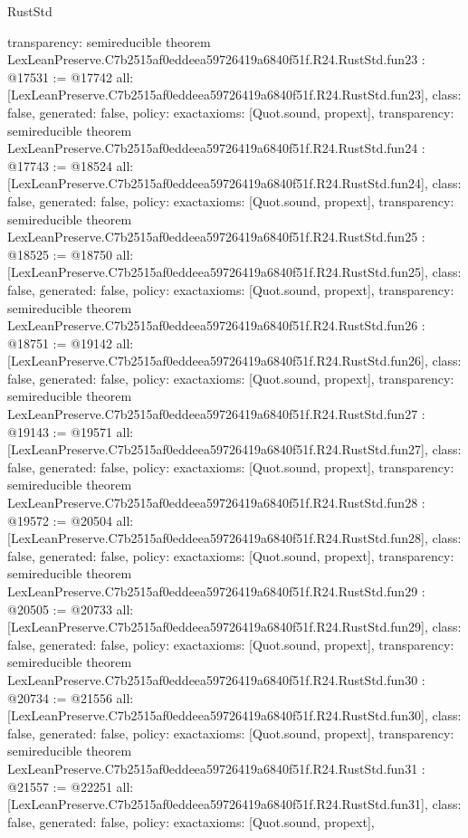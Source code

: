 \begin{lexlean}{RustStd}
\begin{coremodule}
{  transparency: semireducible
}
theorem LexLeanPreserve.C7b2515af0eddeea59726419a6840f51f.R24.RustStd.fun23 : @17531 := @17742 {
  all: [LexLeanPreserve.C7b2515af0eddeea59726419a6840f51f.R24.RustStd.fun23],
  class: false,
  generated: false,
  policy: exact{axioms: [Quot.sound, propext]},
  transparency: semireducible
}
theorem LexLeanPreserve.C7b2515af0eddeea59726419a6840f51f.R24.RustStd.fun24 : @17743 := @18524 {
  all: [LexLeanPreserve.C7b2515af0eddeea59726419a6840f51f.R24.RustStd.fun24],
  class: false,
  generated: false,
  policy: exact{axioms: [Quot.sound, propext]},
  transparency: semireducible
}
theorem LexLeanPreserve.C7b2515af0eddeea59726419a6840f51f.R24.RustStd.fun25 : @18525 := @18750 {
  all: [LexLeanPreserve.C7b2515af0eddeea59726419a6840f51f.R24.RustStd.fun25],
  class: false,
  generated: false,
  policy: exact{axioms: [Quot.sound, propext]},
  transparency: semireducible
}
theorem LexLeanPreserve.C7b2515af0eddeea59726419a6840f51f.R24.RustStd.fun26 : @18751 := @19142 {
  all: [LexLeanPreserve.C7b2515af0eddeea59726419a6840f51f.R24.RustStd.fun26],
  class: false,
  generated: false,
  policy: exact{axioms: [Quot.sound, propext]},
  transparency: semireducible
}
theorem LexLeanPreserve.C7b2515af0eddeea59726419a6840f51f.R24.RustStd.fun27 : @19143 := @19571 {
  all: [LexLeanPreserve.C7b2515af0eddeea59726419a6840f51f.R24.RustStd.fun27],
  class: false,
  generated: false,
  policy: exact{axioms: [Quot.sound, propext]},
  transparency: semireducible
}
theorem LexLeanPreserve.C7b2515af0eddeea59726419a6840f51f.R24.RustStd.fun28 : @19572 := @20504 {
  all: [LexLeanPreserve.C7b2515af0eddeea59726419a6840f51f.R24.RustStd.fun28],
  class: false,
  generated: false,
  policy: exact{axioms: [Quot.sound, propext]},
  transparency: semireducible
}
theorem LexLeanPreserve.C7b2515af0eddeea59726419a6840f51f.R24.RustStd.fun29 : @20505 := @20733 {
  all: [LexLeanPreserve.C7b2515af0eddeea59726419a6840f51f.R24.RustStd.fun29],
  class: false,
  generated: false,
  policy: exact{axioms: [Quot.sound, propext]},
  transparency: semireducible
}
theorem LexLeanPreserve.C7b2515af0eddeea59726419a6840f51f.R24.RustStd.fun30 : @20734 := @21556 {
  all: [LexLeanPreserve.C7b2515af0eddeea59726419a6840f51f.R24.RustStd.fun30],
  class: false,
  generated: false,
  policy: exact{axioms: [Quot.sound, propext]},
  transparency: semireducible
}
theorem LexLeanPreserve.C7b2515af0eddeea59726419a6840f51f.R24.RustStd.fun31 : @21557 := @22251 {
  all: [LexLeanPreserve.C7b2515af0eddeea59726419a6840f51f.R24.RustStd.fun31],
  class: false,
  generated: false,
  policy: exact{axioms: [Quot.sound, propext]},
}
\end{coremodule}
\end{lexlean}
